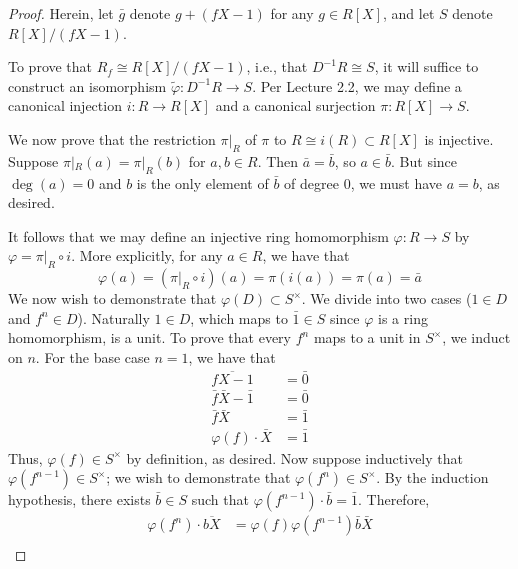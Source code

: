 \documentclass[../psets.tex]{subfiles}
\begin{document}
\begin{enumerate}
\begin{proof}


        Herein, let $\bar{g}$ denote $g+(fX-1)$ for any $g\in R[X]$, and let $S$ denote $R[X]/(fX-1)$.\par
        To prove that $R_f\cong R[X]/(fX-1)$, i.e., that $D^{-1}R\cong S$, it will suffice to construct an isomorphism $\tilde{\varphi}:D^{-1}R\to S$. Per Lecture 2.2, we may define a canonical injection $i:R\to R[X]$ and a canonical surjection $\pi:R[X]\to S$.
        \par
        We now prove that the restriction $\pi|_R$ of $\pi$ to $R\cong i(R)\subset R[X]$ is injective. Suppose $\pi|_R(a)=\pi|_R(b)$ for $a,b\in R$. Then $\bar{a}=\bar{b}$, so $a\in\bar{b}$. But since $\deg(a)=0$ and $b$ is the only element of $\bar{b}$ of degree 0, we must have $a=b$, as desired.\par
        It follows that we may define an injective ring homomorphism $\varphi:R\to S$ by $\varphi=\pi|_R\circ i$. More explicitly, for any $a\in R$, we have that
        \begin{equation*}
            \varphi(a) = (\pi|_R\circ i)(a) = \pi(i(a)) = \pi(a) = \bar{a}
        \end{equation*}
        We now wish to demonstrate that $\varphi(D)\subset S^\times$. We divide into two cases ($1\in D$ and $f^n\in D$). Naturally $1\in D$, which maps to $\bar{1}\in S$ since $\varphi$ is a ring homomorphism, is a unit. To prove that every $f^n$ maps to a unit in $S^\times$, we induct on $n$. For the base case $n=1$, we have that
        \begin{align*}
            \overline{fX-1} &= \bar{0}\\
            \bar{f}\bar{X}-\bar{1} &= \bar{0}\\
            \bar{f}\bar{X} &= \bar{1}\\
            \varphi(f)\cdot\bar{X} &= \bar{1}
        \end{align*}
        Thus, $\varphi(f)\in S^\times$ by definition, as desired. Now suppose inductively that $\varphi(f^{n-1})\in S^\times$; we wish to demonstrate that $\varphi(f^n)\in S^\times$. By the induction hypothesis, there exists $\bar{b}\in S$ such that $\varphi(f^{n-1})\cdot\bar{b}=\bar{1}$. Therefore,
        \begin{align*}
            \varphi(f^n)\cdot\overline{bX} &= \varphi(f)\varphi(f^{n-1})\bar{b}\bar{X}\\

\end{align*}
\end{proof}
\end{enumerate}
\end{document}
